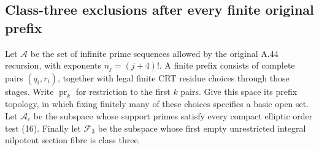 \subsection{Class-three exclusions after every finite original prefix}
\label{sec:ghost-dense-class3}

Let \(\mathscr A\) be the set of infinite prime sequences
allowed by the original A.44 recursion, with exponents
\(n_j=(j+4)!\). A finite prefix consists of complete
pairs \((q_i,r_i)\), together with legal finite CRT
residue choices through those stages. Write \(\operatorname{pr}_k\) for
restriction to the first \(k\) pairs. Give this space
its prefix topology, in which fixing finitely many
of these choices specifies a basic open set.
Let \(\mathscr A_c\) be the subspace whose support
primes satisfy every compact elliptic order test (16).
Finally let \(\mathscr F_3\) be the subspace whose
first empty unrestricted integral nilpotent section
fibre is class three.

